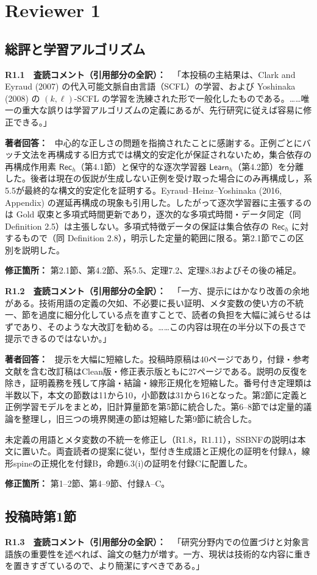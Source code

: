 \documentclass[10pt,a4paper]{ltjsarticle}
\newcommand{\Comment}[1]{\par\medskip\noindent\textbf{#1　査読コメント（引用部分の全訳）：}\ }
\newcommand{\Reply}{\par\noindent\textbf{著者回答：}\ }
\newcommand{\Location}[1]{\par\noindent\textbf{修正箇所：} #1\par}
\newcommand{\Bh}{\mathsf{Rec}_h}
\newcommand{\Ah}{\mathsf{Learn}_h}
\begin{document}
\section*{Reviewer 1}
\subsection*{総評と学習アルゴリズム}

\Comment{R1.1}
「本投稿の主結果は、Clark and Eyraud (2007) の代入可能文脈自由言語（SCFL）の学習、および Yoshinaka (2008) の $(k,\ell)$-SCFL の学習を洗練された形で一般化したものである。……唯一の重大な誤りは学習アルゴリズムの定義にあるが、先行研究に従えば容易に修正できる。」

\Reply
中心的な正しさの問題を指摘されたことに感謝する。正例ごとにバッチ文法を再構成する旧方式では構文的安定化が保証されないため，集合依存の再構成作用素 $\Bh$（第4.1節）と保守的な逐次学習器 $\Ah$（第4.2節）を分離した。後者は現在の仮説が生成しない正例を受け取った場合にのみ再構成し，系5.5が最終的な構文的安定化を証明する。Eyraud--Heinz--Yoshinaka (2016, Appendix) の遅延再構成の現象も引用した。したがって逐次学習器に主張するのは Gold 収束と多項式時間更新であり，逐次的な多項式時間・データ同定（同 Definition 2.5）は主張しない。多項式特徴データの保証は集合依存の $\Bh$ に対するもので（同 Definition 2.8），明示した定量的範囲に限る。第2.1節でこの区別を説明した。
\Location{第2.1節、第4.2節、系5.5、定理7.2、定理8.3およびその後の補足。}

\Comment{R1.2}
「一方、提示にはかなり改善の余地がある。技術用語の定義の欠如、不必要に長い証明、メタ変数の使い方の不統一、節を過度に細分化している点を直すことで、読者の負担を大幅に減らせるはずであり、そのような大改訂を勧める。……この内容は現在の半分以下の長さで提示できるのではないか。」

\Reply
提示を大幅に短縮した。投稿時原稿は40ページであり，付録・参考文献を含む改訂稿はClean版・修正表示版ともに27ページである。説明の反復を除き，証明義務を残して序論・結論・線形正規化を短縮した。番号付き定理類は半数以下，本文の節数は11から10，小節数は31から16となった。第2節に定義と正例学習モデルをまとめ，旧計算量節を第5節に統合した。第6--8節では定量的議論を整理し，旧三つの境界関連の節は短縮した第9節に統合した。

未定義の用語とメタ変数の不統一を修正し（R1.8，R1.11），SSBNFの説明は本文に置いた。両査読者の提案に従い，型付き生成語と正規化の証明を付録A，線形spineの正規化を付録B，命題6.3(i)の証明を付録Cに配置した。
\Location{第1--2節、第4--9節、付録A--C。}

\subsection*{投稿時第1節}
\Comment{R1.3}
「研究分野内での位置づけと対象言語族の重要性を述べれば、論文の魅力が増す。一方、現状は技術的な内容に重きを置きすぎているので、より簡潔にすべきである。」
\end{document}
